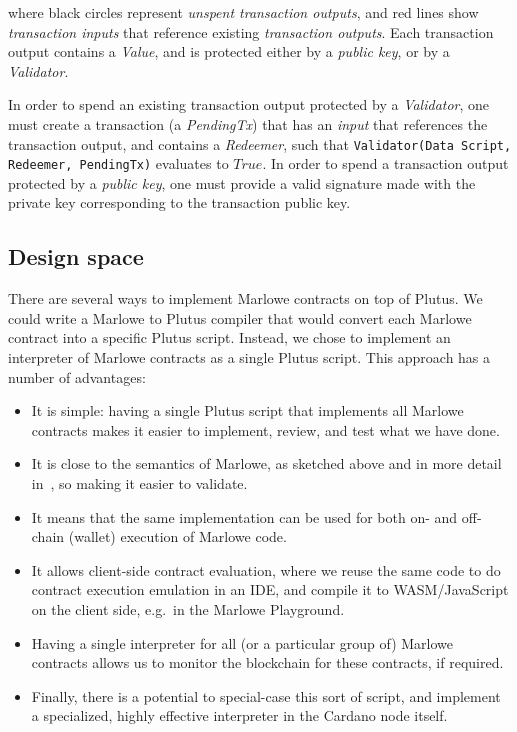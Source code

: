 \documentclass[runningheads]{llncs}
\begin{document}
\noindent
where black circles represent \emph{unspent transaction outputs}, and red lines show \emph{transaction inputs}
that reference existing \emph{transaction outputs}.
Each transaction output contains a \emph{Value}, and is protected either by a \emph{public key},
or by a \emph{Validator}.

In order to spend an existing transaction output protected by a \emph{Validator},
one must create a transaction (a \emph{PendingTx}) that has an \emph{input} that references the transaction output,
and contains a \emph{Redeemer}, such that \texttt{Validator(Data Script, Redeemer, PendingTx)} evaluates to $True$.
In order to spend a transaction output protected by a \emph{public key}, one must provide a valid signature
made with the private key corresponding to the transaction public key.


\subsection{Design space}

There are several ways to implement Marlowe contracts on top of Plutus.
We could write a Marlowe to Plutus compiler that would convert
each Marlowe contract into a specific Plutus script.
Instead, we chose to implement an interpreter of Marlowe contracts as a single Plutus script.
This approach has a number of advantages:
\begin{itemize}
\item It is simple: having a single Plutus script that implements all Marlowe contracts
makes it easier to implement, review, and test what we have done.
\item It is close to the semantics of Marlowe, as sketched above and in more detail in~\cite{isola-marlowe},
so making it easier to validate.
\item It means that the same implementation can be used for both on- and off-chain (wallet) execution of Marlowe code.
\item It allows client-side contract evaluation, where we reuse the same code
to do contract execution emulation in an IDE, and compile it to WASM/JavaScript on the client side,
e.g.\ in the Marlowe Playground.
\item Having a single interpreter for all (or a particular group of) Marlowe contracts allows us
  to monitor the blockchain for these contracts, if required.
\item Finally, there is a potential to special-case this sort of script,
  and implement a specialized, highly effective interpreter in the Cardano node itself.
\end{itemize}
\end{document}
